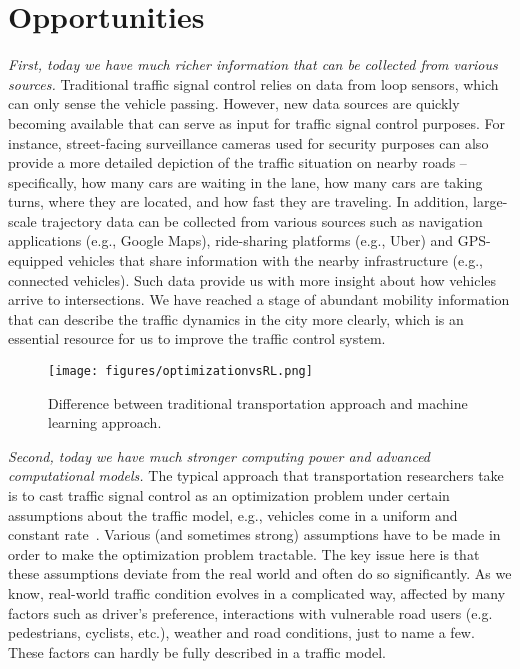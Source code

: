 \section{Opportunities}
\emph{First, today we have much richer information that can be collected from various sources.} Traditional traffic signal control relies on data from loop sensors, which can only sense the vehicle passing. However, new data sources are quickly becoming available that can serve as input for traffic signal control purposes. For instance, street-facing surveillance cameras used for security purposes can also provide a more detailed depiction of  the traffic situation on nearby roads -- specifically, how many cars are waiting in the lane, how many cars are taking turns, where they are located, and how fast they are traveling. In addition, large-scale trajectory data can be collected from various sources such as navigation applications (e.g., Google Maps),  ride-sharing platforms (e.g., Uber) and GPS-equipped vehicles that share information with the nearby infrastructure (e.g., connected vehicles). Such data provide us with more insight about how vehicles arrive to intersections. We have reached a stage of abundant mobility information that can describe the traffic dynamics in the city more clearly, which is an essential resource for us to improve the traffic control system.


 
\begin{figure}[htbp]
\centering
\texttt{[image: figures/optimizationvsRL.png]}
\caption{Difference between traditional transportation approach and machine learning approach.}
\label{fig:optvsrl}
\end{figure}

\emph{Second, today we have much stronger computing power and advanced computational models.} The typical approach that transportation researchers take is to cast traffic signal control as an optimization problem under certain assumptions about the traffic model, e.g., vehicles come in a uniform and constant rate~\cite{RPM04}.  Various (and sometimes strong) assumptions have to be made in order to make the optimization problem tractable. The key issue here is that these assumptions deviate from the real world and often do so significantly. As we know, real-world traffic condition evolves in a complicated way, affected by many factors such as driver's preference, interactions with vulnerable road users (e.g. pedestrians, cyclists, etc.), weather and road conditions, just to name a few. These factors can hardly be fully described in a traffic model.


